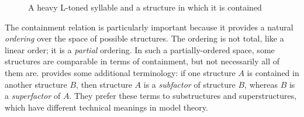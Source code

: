 \documentclass{CUP-JNL-PHO}%
\theoremstyle{definition}
\numberwithin{equation}{section}
\theoremstyle{definition}
\begin{document}
\begin{figure}[h]
	\centering
	\begin{minipage}[t]{0.32\textwidth}
		
		
		\centering
		\label{fig.restriction:a}
	\end{minipage}	
	\begin{minipage}[t]{0.32\textwidth}
		\label{fig.restriction:b}
	\end{minipage}
	\caption{A heavy L-toned syllable and a structure in which it is contained}
	\label{fig.restriction}
\end{figure}


The containment relation is particularly important because it provides
a natural \textit{ordering} over the space of possible structures. The
ordering is not total, like a linear order; it is a \textit{partial}
ordering. In such a partially-ordered space, some structures are
comparable in terms of containment, but not necessarily all of them
are. \citet{chandleeBufia2019} provides some additional terminology:
if one structure \(A\) is contained in another structure \(B\), then
structure \(A\) is a \textit{subfactor} of structure \(B\), whereas
\(B\) is a \textit{superfactor} of \(A\). They prefer these terms to
substructures and superstructures, which have different
technical meanings in model theory.
\end{document}

